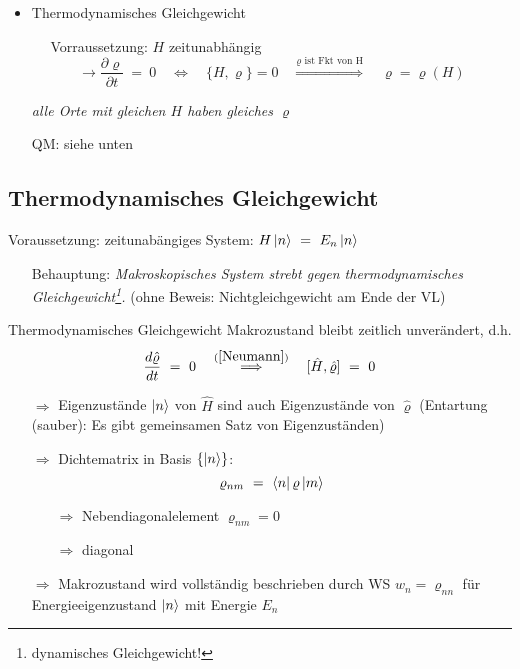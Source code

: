 \begin{itemize}
    \item Thermodynamisches Gleichgewicht
    \item[] $\quad$ Vorraussetzung: $H$ zeitunabhängig
    \begin{equation}
        \rightarrow \frac{\partial \varrho}{\partial t} \ = \ 0 \quad \Leftrightarrow \quad \{H,\varrho\}=0 \quad \overset{\varrho \text{ ist Fkt von H}}{\Longrightarrow} \quad \varrho = \varrho(H)
    \end{equation}
    \item[] \centering \emph{\glqq alle Orte mit gleichen $H$ haben gleiches $\varrho$\grqq} 
    \item[] QM: siehe unten
\end{itemize}


\subsection{Thermodynamisches Gleichgewicht}
Voraussetzung: zeitunabängiges System: $H \ket{n} \ = \ E_n \ket{n}$
\begin{itemize}
    \item[] Behauptung: \emph{Makroskopisches System strebt gegen thermodynamisches Gleichgewicht\footnote{dynamisches Gleichgewicht!}.} (ohne Beweis: Nichtgleichgewicht am Ende der VL)
\end{itemize}

\begin{definition}{Thermodynamisches Gleichgewicht}
    Makrozustand bleibt zeitlich unverändert, d.h.
    \begin{equation}
        \frac{d \hat{\varrho}}{d t} \ = \ 0 \quad \stackrel{\equa{Neumann}}{\Longrightarrow} \quad [\hat{H}, \hat{\varrho}] \ = \ 0
    \end{equation}
\end{definition}

\begin{itemize}
    \item[$\Rightarrow$] Eigenzustände $\ket{n}$ von $\hat{H}$ sind auch Eigenzustände von $\hat{\varrho}$ (Entartung (sauber): Es gibt gemeinsamen Satz von Eigenzuständen)
    \item[$\Rightarrow$] Dichtematrix in Basis $\{\ket{n}\}$:
    \begin{equation}
        \varrho_{nm} \ = \ \bra{n}\varrho \ket{m}
    \end{equation}
    \begin{itemize}
        \item[$\Rightarrow$] Nebendiagonalelement $\varrho_{nm} = 0$
        \item[$\Rightarrow$] diagonal
    \end{itemize}
    \item[$\Rightarrow$] Makrozustand wird vollständig beschrieben durch WS $w_n = \varrho_{nn}$ für Energieeigenzustand $\ket{n}$ mit Energie $E_n$ 
\end{itemize}

